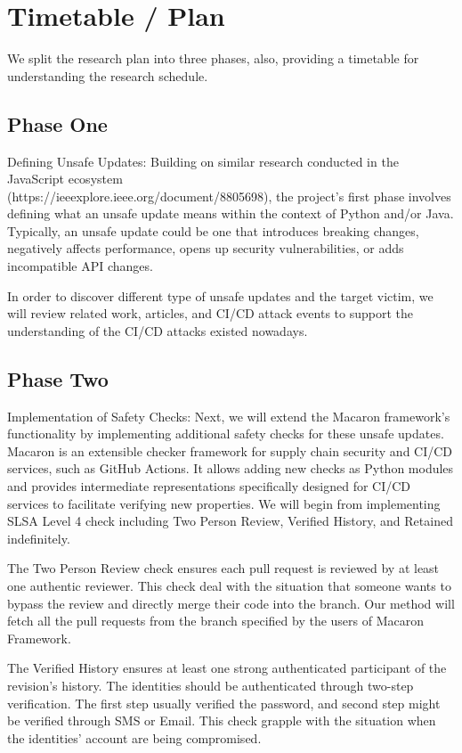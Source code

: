 \section{Timetable / Plan}
We split the research plan into three phases, also, providing a timetable for understanding 
the research schedule.

\subsection{Phase One}
Defining Unsafe Updates: Building on similar research conducted in the JavaScript ecosystem 
\\(https://ieeexplore.ieee.org/document/8805698), the project's first phase 
involves defining what an unsafe update means within the context of Python and/or Java. 
Typically, an unsafe update could be one that introduces breaking changes, 
negatively affects performance, opens up security vulnerabilities, 
or adds incompatible API changes.

In order to discover different type of unsafe updates and the target victim, we will review 
related work, articles, and CI/CD attack events to support the understanding of the CI/CD 
attacks existed nowadays. 

\subsection{Phase Two}
Implementation of Safety Checks: Next, we will extend the Macaron framework's 
functionality by implementing additional safety checks for these unsafe updates.
Macaron is an extensible checker framework for supply chain security and CI/CD services,
such as GitHub Actions. It allows adding new checks as Python modules and provides 
intermediate representations specifically designed for CI/CD services to facilitate 
verifying new properties. We will begin from implementing SLSA Level 4 check including Two 
Person Review, Verified History, and Retained indefinitely.

The Two Person Review check ensures each pull request is reviewed by at least one authentic reviewer.
This check deal with the situation that someone wants to bypass the review and directly merge 
their code into the branch. Our method will fetch all the pull requests from the branch 
specified by the users of Macaron Framework.

The Verified History ensures at least one strong authenticated participant of the revision's history.
The identities should be authenticated through two-step verification. The first step usually 
verified the password, and second step might be verified through SMS or Email. This check grapple
with the situation when the identities' account are being compromised.

